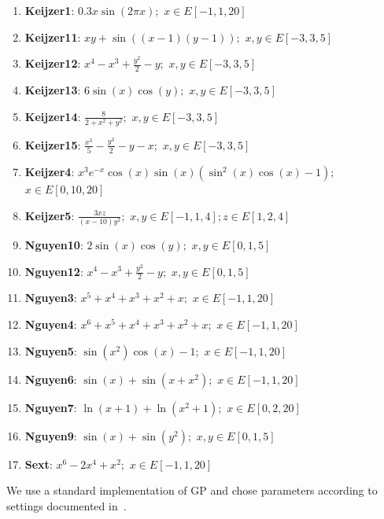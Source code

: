 \begin{enumerate}
\item \textbf{Keijzer1}: $0.3x \sin(2 \pi x);$ $x \in E[-1,1,20]$
\item \textbf{Keijzer11}: $x y+\sin((x-1)(y-1));$ $x, y \in E[-3,3,5]$
\item \textbf{Keijzer12}: $x^{4}-x^{3}+\frac{y^{2}}{2}-y;$ $x, y \in E[-3,3,5]$
\item \textbf{Keijzer13}: $6 \sin(x) \cos(y);$ $x, y \in E[-3,3,5]$
\item \textbf{Keijzer14}: $\frac{8}{2 + x^{2} + y^{2}};$ $x,y \in E[-3,3,5]$
\item \textbf{Keijzer15}: $\frac{x^{3}}{5} - \frac{y^{3}}{2} - y - x;$ $x, y \in E[-3,3,5]$
\item \textbf{Keijzer4}: $x^{3} e^{-x} \cos(x) \sin(x) (\sin^{2}(x) \cos(x) - 1);$ $x \in E[0,10,20]$
\item \textbf{Keijzer5}: $\frac{3 x z}{(x - 10) y^{2}};$ $x,y \in E[-1,1,4]; z \in E[1,2,4]$
\item \textbf{Nguyen10}: $2 \sin(x) \cos(y);$ $x,y \in E[0,1,5]$
\item \textbf{Nguyen12}: $x^{4} - x^{3} + \frac{y^{2}}{2} - y;$ $x,y \in E[0,1,5]$
\item \textbf{Nguyen3}: $x^{5} + x^{4} + x^{3} + x^{2} + x;$ $x \in E[-1,1,20]$
\item \textbf{Nguyen4}: $x^{6} + x^{5} + x^{4} + x^{3} + x^{2} + x;$ $x \in E[-1,1,20]$
\item \textbf{Nguyen5}: $\sin(x^{2}) \cos(x) - 1;$ $x \in E[-1,1,20]$
\item \textbf{Nguyen6}: $\sin(x) + \sin(x + x^{2});$ $x \in E[-1,1,20]$
\item \textbf{Nguyen7}: $\ln(x + 1) + \ln(x^{2} + 1);$ $x \in E[0,2,20]$
\item \textbf{Nguyen9}: $\sin(x) + \sin(y^{2});$ $x,y \in E[0,1,5]$
\item \textbf{Sext}: $x^{6} - 2 x^{4} + x^{2};$ $x \in E[-1,1,20]$
\end{enumerate}

We use a standard implementation of GP and chose parameters according to settings documented in~\cite{krawiecGecco2014}.


